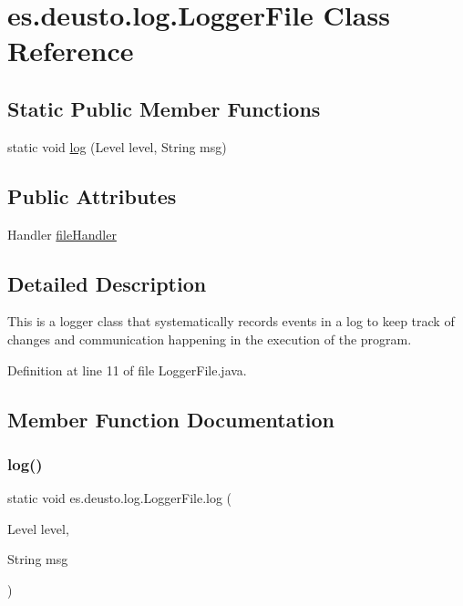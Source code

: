 \hypertarget{classes_1_1deusto_1_1log_1_1_logger_file}{}\section{es.\+deusto.\+log.\+Logger\+File Class Reference}
\label{classes_1_1deusto_1_1log_1_1_logger_file}
\subsection*{Static Public Member Functions}
\begin{DoxyCompactItemize}
\item 
static void \hyperlink{classes_1_1deusto_1_1log_1_1_logger_file_a4e06bbb39aba89d877644269e24f679f}{log} (Level level, String msg)
\end{DoxyCompactItemize}
\subsection*{Public Attributes}
\begin{DoxyCompactItemize}
\item 
Handler \hyperlink{classes_1_1deusto_1_1log_1_1_logger_file_a9140523c75d641a5716eb51f175e9efa}{file\+Handler}
\end{DoxyCompactItemize}


\subsection{Detailed Description}
This is a logger class that systematically records events in a log to keep track of changes and communication happening in the execution of the program. 

Definition at line 11 of file Logger\+File.\+java.



\subsection{Member Function Documentation}
\mbox{\label{classes_1_1deusto_1_1log_1_1_logger_file_a4e06bbb39aba89d877644269e24f679f}} 
\subsubsection{\texorpdfstring{log()}{log()}}
{\footnotesize\ttfamily static void es.\+deusto.\+log.\+Logger\+File.\+log (\begin{DoxyParamCaption}\item[{Level}]{level,  }\item[{String}]{msg }\end{DoxyParamCaption})\hspace{0.3cm}{\ttfamily [static]}}

